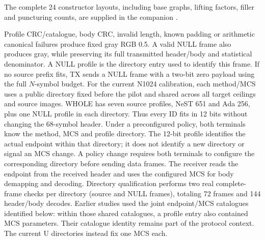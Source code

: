 \documentclass[10pt,letterpaper]{article}
\begin{document}
The complete 24 constructor layouts, including base graphs, lifting factors, filler and puncturing counts, are supplied in the companion .

Profile CRC/catalogue, body CRC, invalid length, known padding or arithmetic canonical failures produce fixed gray RGB 0.5. A valid NULL frame also produces gray, while preserving its full transmitted header/body and statistical denominator. A NULL profile is the directory entry used to identify this frame. If no source prefix fits, TX sends a NULL frame with a two-bit zero payload using the full $N$-symbol budget. For the current N1024 calibration, each method/MCS uses a public directory fixed before the pilot and shared across all target ceilings and source images. WHOLE has seven source profiles, NeST 651 and Ada 256, plus one NULL profile in each directory. Thus every ID fits in 12 bits without changing the 68-symbol header. Under a preconfigured policy, both terminals know the method, MCS and profile directory. The 12-bit profile identifies the actual endpoint within that directory; it does not identify a new directory or signal an MCS change. A policy change requires both terminals to configure the corresponding directory before sending data frames. The receiver reads the endpoint from the received header and uses the configured MCS for body demapping and decoding. Directory qualification performs two real complete-frame checks per directory (source and NULL frames), totaling 72 frames and 144 header/body decodes. Earlier studies used the joint endpoint/MCS catalogues identified below: within those shared catalogues, a profile entry also contained MCS parameters. Their catalogue identity remains part of the protocol context. The current U directories instead fix one MCS each.
\end{document}
